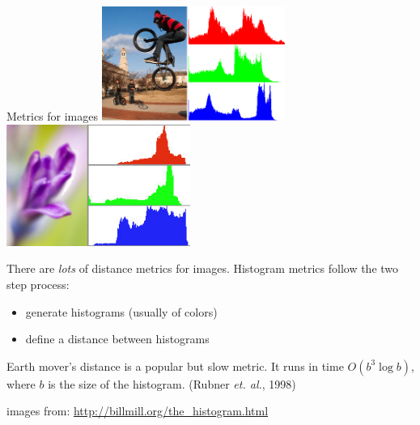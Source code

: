 \begin{frame}[fragile]{Metrics for images}
\includegraphics[width=6cm]{slides/imagehistogram2.png}
\includegraphics[width=6cm]{slides/imagehistogram3b.jpg}

\vspace{0.15in}
There are \emph{lots} of distance metrics for images.
Histogram metrics follow the two step process:
\begin{itemize}
\item generate histograms (usually of colors)
\item define a distance between histograms
\end{itemize}

Earth mover's distance is a popular but slow metric.
It runs in time $O(b^3 \log b)$, where $b$ is the size of the histogram.
(Rubner \emph{et. al.}, 1998)

\vspace{0.05in}
{\tiny
images from: \url{http://billmill.org/the_histogram.html}
}
\end{frame}


%
